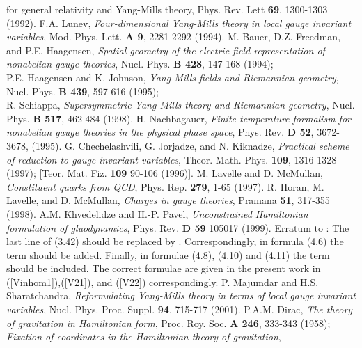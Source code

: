 \documentclass[a4paper,12pt]{article}
\begin{document}
\begin{thebibliography}{99}
{for general relativity and Yang-Mills theory},
Phys. Rev. Lett {\bf 69}, 1300-1303 (1992).
%
F.A. Lunev,
{\it Four-dimensional Yang-Mills theory in local gauge invariant variables},
Mod. Phys. Lett. {\bf A 9}, 2281-2292 (1994).
%
M. Bauer, D.Z. Freedman, and P.E. Haagensen,
{\it Spatial geometry of the electric field representation of nonabelian
gauge theories},
Nucl. Phys. {\bf B 428}, 147-168 (1994);\\
%
P.E. Haagensen and K. Johnson,
{\it Yang-Mills fields and Riemannian geometry},
Nucl. Phys.  {\bf B 439}, 597-616 (1995);\\
%
R. Schiappa,
{\it Supersymmetric Yang-Mills theory and Riemannian geometry},
Nucl. Phys. {\bf B 517}, 462-484 (1998).
%
H. Nachbagauer,
{\it Finite temperature formalism for nonabelian gauge theories in the
physical phase space},
Phys. Rev. {\bf D 52}, 3672-3678, (1995).
%
G. Chechelashvili, G. Jorjadze, and N. Kiknadze,
{\it Practical scheme of reduction to gauge invariant variables},
Theor. Math. Phys. {\bf 109}, 1316-1328 (1997);
[Teor. Mat. Fiz. {\bf 109} 90-106 (1996)].
%
M. Lavelle and D. McMullan,
{\it Constituent quarks from QCD},
Phys. Rep. {\bf 279}, 1-65 (1997).
%
R. Horan, M. Lavelle, and D. McMullan,
{\it Charges in gauge theories},
Pramana {\bf 51}, 317-355 (1998).
%
A.M. Khvedelidze and H.-P. Pavel,
{\it Unconstrained Hamiltonian formulation of \coordHE{} gluodynamics},
Phys. Rev. {\bf D 59} 105017 (1999).
%
Erratum to \cite{KP}: The last line of (3.42) should be replaced by
\coordHE{}.
Correspondingly, in formula (4.6) the term
\coordHE{}
should be added.
Finally, in formulae (4.8), (4.10) and (4.11) the term
\coordHE{}
should be included.
The correct formulae are given in the present work in
(\ref{Vinhom1}),(\ref{V21}), and (\ref{V22}) correspondingly.
%
P. Majumdar and H.S. Sharatchandra,
{\it Reformulating Yang-Mills theory in terms of local gauge invariant variables},
Nucl. Phys. Proc. Suppl. {\bf 94}, 715-717 (2001).
%
P.A.M. Dirac,
{\it The theory of gravitation in Hamiltonian form},
Proc. Roy. Soc. {\bf A 246}, 333-343 (1958);\\
%
{\it Fixation of coordinates in the Hamiltonian theory of gravitation},

\end{thebibliography}
\end{document}

